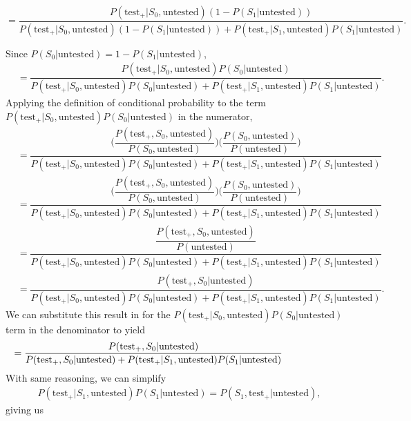 \documentclass[12pt,twoside]{smiththesis}
\begin{document}
\[ = \dfrac{{P(\text{test}_+|S_0, \text{untested})}(1 - P(S_1|\text{untested}))}{P(\text{test}_+|S_0, \text{untested})(1-P(S_1|\text{untested})) + P(\text{test}_+|S_1, \text{untested}) P(S_1|\text{untested})}.\]

\noindent Since \(P(S_0|\text{untested}) = 1 - P(S_1|\text{untested})\),
\begin{align*} 
&=  \dfrac{{P(\text{test}_+|S_0, \text{untested})}P(S_0|\text{untested})}{P(\text{test}_+|S_0, \text{untested})P(S_0|\text{untested}) + P(\text{test}_+|S_1, \text{untested}) P(S_1|\text{untested})}.
\end{align*}
Applying the definition of conditional probability to the term
\(P(\text{test}_+|S_0, \text{untested})P(S_0|\text{untested})\) in the numerator,
\begin{align*}
&=
    \dfrac{\Big( \dfrac{P(\text{test}_+,S_0, \text{untested})}{P(S_0, \text{untested})} \Big) \Big(\dfrac{P(S_0, \text{untested})}{P(\text{untested})}\Big)}{P(\text{test}_+|S_0, \text{untested})P(S_0|\text{untested}) + P(\text{test}_+|S_1, \text{untested}) P(S_1|\text{untested})}\\ 
    &= \dfrac{\Big( \dfrac{P(\text{test}_+,S_0, \text{untested})}{P(S_0, \text{untested})} \Big) \Big(\dfrac{P(S_0, \text{untested})}{P(\text{untested})}\Big)}{P(\text{test}_+|S_0, \text{untested})P(S_0|\text{untested}) + P(\text{test}_+|S_1, \text{untested}) P(S_1|\text{untested})}\\
    &=  \dfrac{\dfrac{P(\text{test}_+,S_0, \text{untested})}{P(\text{untested})}}{P(\text{test}_+|S_0, \text{untested})P(S_0|\text{untested}) + P(\text{test}_+|S_1, \text{untested}) P(S_1|\text{untested})}\\
    &=  \dfrac{{P(\text{test}_+,S_0|\text{untested})}}{P(\text{test}_+|S_0, \text{untested})P(S_0|\text{untested}) + P(\text{test}_+|S_1, \text{untested}) P(S_1|\text{untested})}.
\end{align*}
\noindent We can substitute this result in for the \(P(\text{test}_+|S_0, \text{untested})P(S_0|\text{untested})\) term in the denominator to yield
\begin{align*}
  &=  \dfrac{{P(\text{test}_+,S_0|\text{untested})}}{P(\text{test}_+,S_0|\text{untested}) + P(\text{test}_+|S_1, \text{untested}) P(S_1|\text{untested})} \hspace{ 20 mm }
\end{align*}
With same reasoning, we can simplify
\begin{align*}
P(\text{test}_+|S_1, \text{untested})P(S_1|\text{untested}) = P(S_1, \text{test}_+|\text{untested}),
\end{align*} giving us
\end{document}
